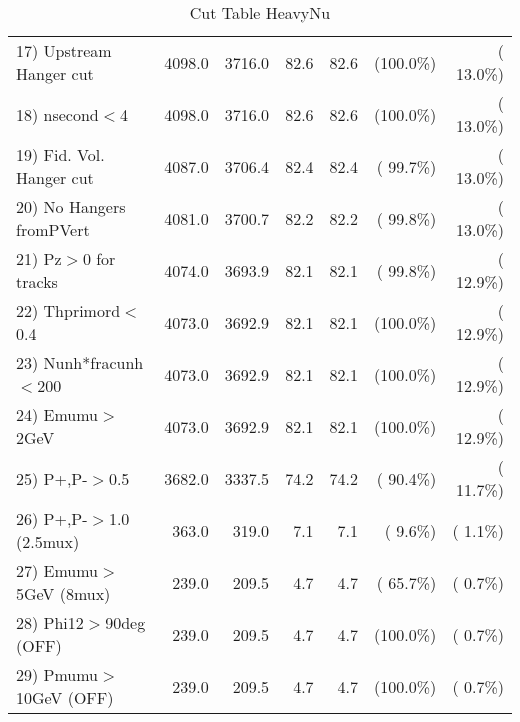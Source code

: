 \begin{table}[h!]
\begin{tabular}{||l||r|r|r|r|r|r||}
 17) Upstream Hanger cut  &       4098.0 &       3716.0 &         82.6 &         82.6 & (100.0\%) & ( 13.0\%) \\
 18) nsecond$<$4          &       4098.0 &       3716.0 &         82.6 &         82.6 & (100.0\%) & ( 13.0\%) \\
 19) Fid. Vol. Hanger cut &       4087.0 &       3706.4 &         82.4 &         82.4 & ( 99.7\%) & ( 13.0\%) \\
 20) No Hangers fromPVert &       4081.0 &       3700.7 &         82.2 &         82.2 & ( 99.8\%) & ( 13.0\%) \\
 21) Pz$>$0 for tracks    &       4074.0 &       3693.9 &         82.1 &         82.1 & ( 99.8\%) & ( 12.9\%) \\
 22) Thprimord$<$0.4      &       4073.0 &       3692.9 &         82.1 &         82.1 & (100.0\%) & ( 12.9\%) \\
 23) Nunh*fracunh$<$200   &       4073.0 &       3692.9 &         82.1 &         82.1 & (100.0\%) & ( 12.9\%) \\
 24) Emumu$>$2GeV         &       4073.0 &       3692.9 &         82.1 &         82.1 & (100.0\%) & ( 12.9\%) \\
 25) P+,P-$>$0.5          &       3682.0 &       3337.5 &         74.2 &         74.2 & ( 90.4\%) & ( 11.7\%) \\
 26) P+,P-$>$1.0 (2.5mux) &        363.0 &        319.0 &          7.1 &          7.1 & (  9.6\%) & (  1.1\%) \\
 27) Emumu$>$5GeV  (8mux) &        239.0 &        209.5 &          4.7 &          4.7 & ( 65.7\%) & (  0.7\%) \\
 28) Phi12$>$90deg  (OFF) &        239.0 &        209.5 &          4.7 &          4.7 & (100.0\%) & (  0.7\%) \\
 29) Pmumu$>$10GeV  (OFF) &        239.0 &        209.5 &          4.7 &          4.7 & (100.0\%) & (  0.7\%) \\
 \hline
 \hline
 \end{tabular}
 \caption{Cut Table  HeavyNu  }
 \label{tab-cutheavy_neutrino}
 \end{table}
